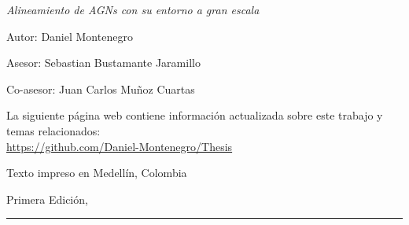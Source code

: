 
\thispagestyle{empty}

\hfill

\vfill

\medskip


\noindent
\textit{
Alineamiento de AGNs con su entorno a gran escala
}




Autor: Daniel Montenegro

Asesor: Sebastian Bustamante Jaramillo 

Co-asesor: Juan Carlos Mu\~noz Cuartas



\vfill

\vfill

\noindent
La siguiente página web contiene información actualizada sobre este trabajo y temas relacionados: \\
\url{https://github.com/Daniel-Montenegro/Thesis}


\noindent
Texto impreso en Medellín, Colombia

\noindent
Primera Edici\'on, 
\monthname \ \the\year

\vspace{1cm}
\hrule
\bigskip

\cleardoublepage

%
%
%
%
%
%

